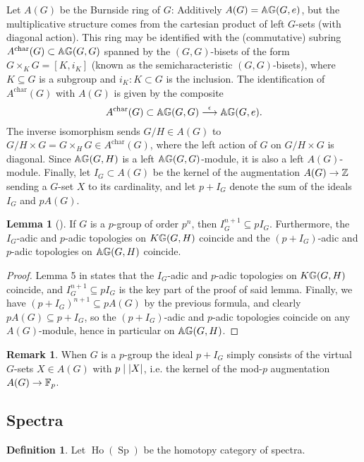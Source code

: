 \documentclass[10pt]{amsart}
\theoremstyle{definition}
\DeclareMathOperator{\Sp}{Sp}
\DeclareMathOperator{\Ho}{Ho}
\newtheorem{lemma}[theorem]{Lemma}
\newtheorem{remark}[theorem]{Remark}
\newtheorem{definition}[theorem]{Definition}
\DeclarePairedDelimiter{\abs}{\lvert}{\rvert}
\begin{document}
Let $A(G)$ be the Burnside ring of $G$: Additively $A(G) = \mathbb{A} \mathbb{G}(G,e)$, but the multiplicative structure comes from the cartesian product of left $G$-sets (with diagonal action). This ring may be identified with the (commutative) subring $A^{\text{char}}(G) \subset \mathbb{A} \mathbb{G}(G,G)$ spanned by the $(G,G)$-bisets of the form $G \times_K G = [K,i_K]$ (known as the semicharacteristic $(G,G)$-bisets), where $K \subseteq G$ is a subgroup and $i_K \colon K \subset G$ is the inclusion. The identification of $A^{\text{char}}(G)$ with $A(G)$ is given by the composite
\[
A^{\text{char}}(G) \subset \mathbb{A} \mathbb{G}(G,G) \overset{\epsilon}{\longrightarrow} \mathbb{A} \mathbb{G}(G,e).
\]
The inverse isomorphism sends $G/H \in A(G)$ to $G/H \times G = G \times_H G \in A^{\text{char}}(G)$, where the left action of $G$ on $G/H \times G$ is diagonal. Since $\mathbb{A} \mathbb{G}(G,H)$ is a left $\mathbb{A} \mathbb{G}(G,G)$-module, it is also a left $A(G)$-module. Finally, let $I_G \subset A(G)$ be the kernel of the augmentation $A(G) \rightarrow \mathbb{Z}$ sending a $G$-set $X$ to its cardinality, and let $p+I_G$ denote the sum of the ideals $I_G$ and $pA(G)$.

\begin{lemma}[\cite{MayMcClure}]\label{lemmaIpadic}
If $G$ is a $p$-group of order $p^n$, then $I_G^{n+1}\subseteq pI_G$. Furthermore, the $I_G$-adic and $p$-adic topologies on $K \mathbb{G}(G,H)$ coincide and the $(p+I_G)$-adic and $p$-adic topologies on $\mathbb{A} \mathbb{G}(G,H)$ coincide.
\end{lemma}

\begin{proof}
Lemma 5 in \cite{MayMcClure} states that the $I_G$-adic and $p$-adic topologies on $K \mathbb{G}(G,H)$ coincide, and $I_G^{n+1}\subseteq pI_G$ is the key part of the proof of said lemma. Finally, we have $(p+I_G)^{n+1} \subseteq p A(G)$ by the previous formula, and clearly $pA(G)\subseteq p+I_G$, so the $(p+I_G)$-adic and $p$-adic topologies coincide on any $A(G)$-module, hence in particular on $\mathbb{A} \mathbb{G}(G,H)$.
\end{proof}

\begin{remark}
When $G$ is a $p$-group the ideal $p+I_G$ simply consists of the virtual $G$-sets $X\in A(G)$ with $p \mid \abs X$, i.e. the kernel of the mod-$p$ augmentation $A(G)\to \mathbb{F}_p$.
\end{remark}

\subsection{Spectra}

\begin{definition}
Let $\Ho(\Sp)$ be the homotopy category of spectra.
\end{definition}
\end{document}
